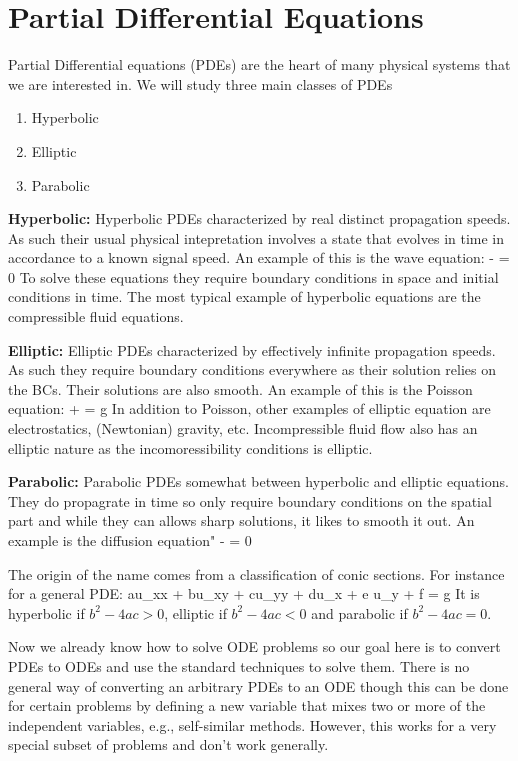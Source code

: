 \section{Partial Differential Equations}

Partial Differential equations (PDEs) are the heart of many physical systems that we are interested in.  We will study three main classes of PDEs
\begin{enumerate}
    \item Hyperbolic
    \item Elliptic
    \item Parabolic
\end{enumerate}

\noindent\textbf{Hyperbolic:}
Hyperbolic PDEs characterized by real distinct propagation speeds.  As such their usual physical intepretation involves a state that evolves in time in accordance to a known signal speed. An example of this is the wave equation:
\be
{} -  = 0
\ee
To solve these equations they require boundary conditions in space and initial conditions in time. The most typical example of hyperbolic equations are the compressible fluid equations.  

\noindent\textbf{Elliptic:}
Elliptic PDEs characterized by effectively infinite propagation speeds.  As such they require boundary conditions everywhere as their solution relies on the BCs.  Their solutions are also smooth.  An example of this is the Poisson equation:
\be
{} +  = g
\ee
In addition to Poisson, other examples of elliptic equation are electrostatics, (Newtonian) gravity, etc.  Incompressible fluid flow also has an elliptic nature as the incomoressibility conditions is elliptic. 

\noindent\textbf{Parabolic:}
Parabolic PDEs somewhat between hyperbolic and elliptic equations. They do propagrate in time so only require boundary conditions on the spatial part and while they can allows sharp solutions, it likes to smooth it out.  An example is the diffusion equation"
\be
{} -  = 0
\ee

The origin of the name comes from a classification of conic sections.  For instance for a general PDE:
\be
au_{xx} + bu_{xy} + cu_{yy} + du_x + e u_y + f = g
\ee
It is hyperbolic if $b^2 - 4ac > 0$, elliptic if $b^2 - 4ac < 0$ and parabolic if $b^2-4ac = 0$.  

Now we already know how to solve ODE problems so our goal here is to convert PDEs to ODEs and use the standard techniques to solve them.  There is no general way of converting an arbitrary PDEs to an ODE though this can be done for certain problems by defining a new variable that mixes two or more of the independent variables, e.g., self-similar methods.  However, this works for a very special subset of problems and don't work generally. 

